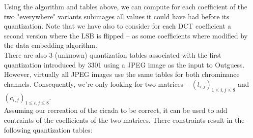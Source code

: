 \documentclass{article}
\begin{document}
Using the algorithm and tables above, we can compute for each coefficient of the two "everywhere" variants  subimages all values it could have had before its quantization. Note that we have also to consider for each DCT coefficient a second version where the LSB is flipped -- as some coefficients where modified by the data embedding algorithm. \\

There are also 3 (unknown) quantization tables associated with the first quantization introduced by 3301 using a JPEG image as the input to Outguess. However, virtually all JPEG images use the same tables for both chrominance channels. Consequently, we're only looking for two matrices -- $(l_{i, j})_{1 \le i, j \le 8}$ and $(c_{i, j})_{1 \le i, j \le 8}$. \\

Assuming our recreation of the cicada to be correct, it can be used to add contraints of the coefficients of the two matrices. There constraints result in the following quantization tables:

\begin{table}
\end{table}



\end{document}
